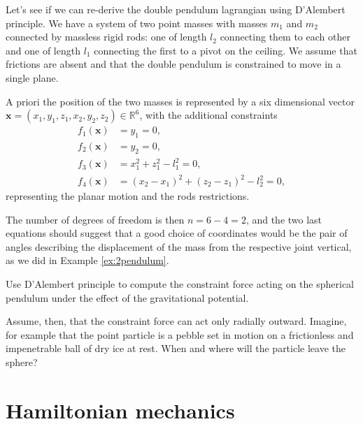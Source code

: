 \documentclass[english,fontsize=11pt,paper=a5,oneside]{scrbook}
\newcommand{\R}{\mathbb{R}}
\newcommand{\bx}{\bm{x}}
\theoremstyle{definition}
\newenvironment{example}
  {\pushQED{\qed}\renewcommand{\qedsymbol}{$\lozenge$}\examplex}
  {\popQED\endexamplex}
\newenvironment{exercise}
  {\pushQED{\qed}\renewcommand{\qedsymbol}{$\maltese$}\exercisex}
  {\popQED\endexercisex}
\begin{document}
\begin{example}[Double pendulum revisited]
    Let's see if we can re-derive the double pendulum lagrangian using D'Alembert principle.
    We have a system of two point masses with masses $m_1$ and $m_2$ connected by massless rigid rods: one of length $l_2$ connecting them to each other and one of length $l_1$ connecting the first to a pivot on the ceiling. We assume that frictions are absent and that the double pendulum is constrained to move in a single plane.

    A priori the position of the two masses is represented by a six dimensional vector
    $\bx = (x_1, y_1, z_1, x_2, y_2, z_2)\in\R^6$, with the additional constraints
    \begin{align}
        f_1(\bx) &= y_1 = 0,\\
        f_2(\bx) &= y_2 = 0,\\
        f_3(\bx) &= x_1^2 + z_1^2 - l_1^2 = 0,\\
        f_4(\bx) &= (x_2-x_1)^2 + (z_2-z_1)^2 - l_2^2 = 0,
    \end{align}
    representing the planar motion and the rods restrictions.

    The number of degrees of freedom is then $n = 6 -4 = 2$, and the two last equations should suggest that a good choice of coordinates would be the pair of angles describing the displacement of the mass from the respective joint vertical, as we did in Example \ref{ex:2pendulum}.
\end{example}

\begin{exercise}
    Use D'Alembert principle to compute the constraint force acting on the spherical pendulum under the effect of the gravitational potential.
    
    Assume, then, that the constraint force can act only radially outward. Imagine, for example that the point particle is a pebble set in motion on a frictionless and impenetrable ball of dry ice at rest.
    When and where will the particle leave the sphere?
\end{exercise}


\chapter{Hamiltonian mechanics}
\end{document}
